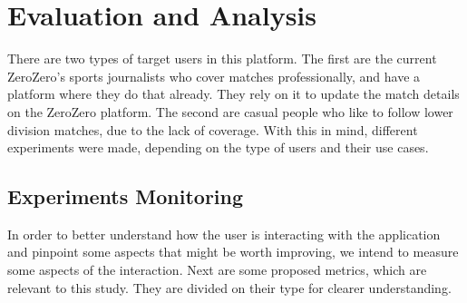 \chapter{Evaluation and Analysis}\label{chap:evaluation-and-analysis}


There are two types of target users in this platform. The first are the current ZeroZero's sports journalists who cover matches professionally, and have a platform where they do that already. They rely on it to update the match details on the ZeroZero platform. The second are casual people who like to follow lower division matches, due to the lack of coverage. With this in mind, different experiments were made, depending on the type of users and their use cases.

\section{Experiments Monitoring}

In order to better understand how the user is interacting with the application and pinpoint some aspects that might be worth improving, we intend to measure some aspects of the interaction. Next are some proposed metrics, which are relevant to this study. They are divided on their type for clearer understanding.

